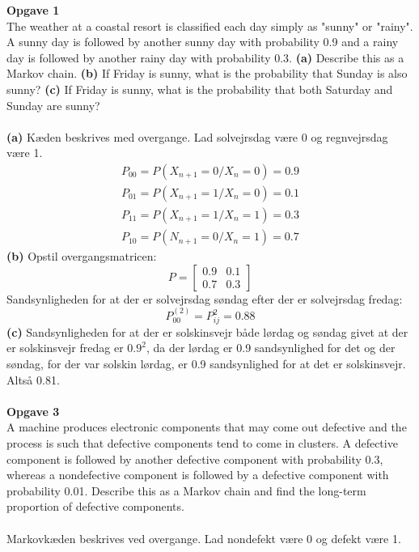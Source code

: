 \documentclass[12pt,a4paper,draft]{report}
\author{Frederik Appel Vardinghus-Nielsen}
\begin{document}
\noindent\textbf{Opgave 1}\\
The weather at a coastal resort is classified each day simply as "sunny" or "rainy". A sunny day is followed by another sunny day with probability 0.9 and a rainy day is followed by another rainy day with probability 0.3. \textbf{(a)} Describe this as a Markov chain. \textbf{(b)} If Friday is sunny, what is the probability that Sunday is also sunny? \textbf{(c)} If Friday is sunny, what is the probability that both Saturday and Sunday are sunny?\\\\
\textbf{(a)} Kæden beskrives med overgange. Lad solvejrsdag være 0 og regnvejrsdag være 1.
\begin{align*}
P_{00}=P(X_{n+1}=0/X_n=0)=0.9\\
P_{01}=P(X_{n+1}=1/X_n=0)=0.1\\
P_{11}=P(X_{n+1}=1/X_n=1)=0.3\\
P_{10}=P(N_{n+1}=0/X_n=1)=0.7
\end{align*}
\textbf{(b)} Opstil overgangsmatricen:
\begin{equation}
P=\begin{bmatrix}
0.9 & 0.1\\
0.7 & 0.3
\end{bmatrix}
\end{equation}
Sandsynligheden for at der er solvejrsdag søndag efter der er solvejrsdag fredag:
\begin{equation}
P_{00}^{(2)}=P^2_{ij}=0.88
\end{equation}
\textbf{(c)} Sandsynligheden for at der er solskinsvejr både lørdag og søndag givet at der er solskinsvejr fredag er $0.9^2$, da der lørdag er 0.9 sandsynlighed for det og der søndag, for der var solskin lørdag, er 0.9 sandsynlighed for at det er solskinsvejr.\\
Altså 0.81.\\\\
\textbf{Opgave 3}\\
A machine produces electronic components that may come out defective and the process is such that defective components tend to come in clusters. A defective component is followed by another defective component with probability 0.3, whereas a nondefective component is followed by a defective component with probability 0.01. Describe this as a Markov chain and find the long-term proportion of defective components.\\\\
Markovkæden beskrives ved overgange. Lad nondefekt være 0 og defekt være 1.
\end{document}
